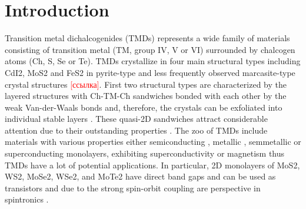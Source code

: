 \documentclass[a4paperm]{article}
\begin{document}
\section*{Introduction}
Transition metal dichalcogenides (TMDs) represents a wide family of materials consisting of transition metal (TM, group IV, V or VI) surrounded by chalcogen atoms (Ch, S, Se or Te). TMDs crystallize in four main structural types including CdI2, MoS2 and FeS2 in pyrite-type and less frequently observed marcasite-type crystal structures \textcolor{red}{[ссылка]}.
First two structural types are characterized by the layered structures with Ch-TM-Ch sandwiches bonded with each other by the weak Van-der-Waals bonds and, therefore, the crystals can be exfoliated into individual stable layers \cite{zhang2020intercalation}. These quasi-2D sandwiches attract considerable attention due to their outstanding properties \cite{li2017graphene, SHI20181, xi2016ising, hu2019recent, pi2019recent}. The zoo of TMDs include materials with various properties either semiconducting \cite{nayeri2018transport}, metallic \cite{zhao20212d}, semmetallic \cite{xu2020high, zhao2020observation} or superconducting \cite{wang2020nodeless} monolayers, exhibiting superconductivity \cite{hsu2017topological} or magnetism \cite{guo2020electronic} thus TMDs have a lot of potential applications. In particular, 2D monolayers of MoS2, WS2, MoSe2, WSe2, and MoTe2 have direct band gaps \cite{dybala2016pressure, huang2016controlling} and can be used as transistors \cite{sebastian2021benchmarking} and due to the strong spin-orbit coupling \cite{rossi2020van, zhou2019spin} are perspective in spintronics \cite{ahn20202d, zibouche2014transition}.
\end{document}
